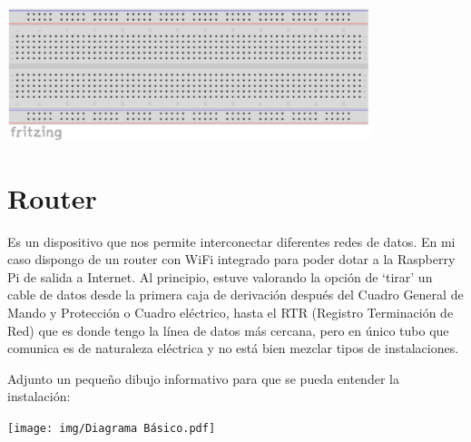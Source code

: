 \begin{itemize}
\begin{center}
\includegraphics[width=400]{img/protoboard.pdf}
\end{center}

\section{Router}
Es un dispositivo que nos permite interconectar diferentes redes de datos. En mi caso dispongo de un router con WiFi integrado para poder dotar a la Raspberry Pi de salida a Internet.
Al principio, estuve valorando la opción de ‘tirar’ un cable de datos desde la primera caja de derivación después del Cuadro General de Mando y Protección o Cuadro eléctrico, hasta el RTR (Registro Terminación de Red) que es donde tengo la línea de datos más cercana, pero en único tubo que comunica es de naturaleza eléctrica y no está bien mezclar tipos de instalaciones.

Adjunto un pequeño dibujo informativo para que se pueda entender la instalación:
\begin{center}
\texttt{[image: img/Diagrama Básico.pdf]}
\end{center}


\end{itemize}
